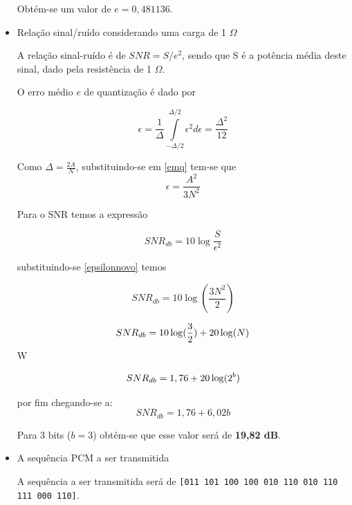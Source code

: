 \documentclass[]{report}
\begin{document}
\begin{itemize}
Obtém-se um valor de $e = 0,481136$.

\item{Relação sinal/ruído considerando uma carga de 1 $\Omega$}

A relação sinal-ruído é de $SNR = S/e^2$, sendo que S é a potência média deste sinal, dado pela resistência de 1 $\Omega$.

O erro médio $e$ de quantização é dado por \cite{renato}

\begin{equation}\label{emq}
\epsilon = \frac{1}{\Delta}\int\limits_{-\Delta/2}^{\Delta/2} \epsilon^2 d\epsilon = \frac{\Delta^2}{12}
\end{equation}

Como $\Delta = \frac{2 A}{N}$, substituindo-se em \ref{emq}  tem-se que
\begin{equation}\label{epsilonnovo}
\epsilon = \frac{A^2}{3N^2}
\end{equation}

Para o SNR temos a expressão

\begin{equation}\label{snrdb}
SNR_{db} = 10 \log{\frac{S}{\epsilon^2}}
\end{equation}

substituindo-se \ref{epsilonnovo} temos

\begin{displaymath}
SNR_{db} = 10 \log(\frac{3 N^2}{2}) 
\end{displaymath}

\begin{displaymath}
SNR_{db} = 10 \log(\frac{3}{2}) + 20 \log(N) \newline
\end{displaymath}W

\begin{displaymath}
SNR_{db}=1,76 + 20 \log(2^b) \newline
\end{displaymath}

por fim chegando-se a:
\begin{equation}
SNR_{db}=1,76 + 6,02 b
\end{equation}

Para 3 bits ($b=3$) obtém-se que esse valor será de \textbf{19,82 dB}.

\item{A sequência PCM a ser transmitida}

A sequência a ser transmitida será de \texttt{[011 101 100 100 010 110 010 110 111 000 110]}.

\end{itemize}
\end{document}

